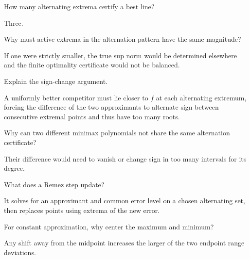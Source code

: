 \begin{problem}\label{prob:ii23-problem-03}
How many alternating extrema certify a best line?
\end{problem}
\begin{solution}
Three.
\end{solution}

\begin{problem}\label{prob:ii23-problem-04}
Why must active extrema in the alternation pattern have the same magnitude?
\end{problem}
\begin{solution}
If one were strictly smaller, the true sup norm would be determined elsewhere and the finite optimality certificate would not be balanced.
\end{solution}

\begin{problem}\label{prob:ii23-problem-05}
Explain the sign-change argument.
\end{problem}
\begin{solution}
A uniformly better competitor must lie closer to $f$ at each alternating extremum, forcing the difference of the two approximants to alternate sign between consecutive extremal points and thus have too many roots.
\end{solution}

\begin{problem}[Uniqueness]\label{prob:ii23-problem-06}
Why can two different minimax polynomials not share the same alternation certificate?
\end{problem}
\begin{solution}
Their difference would need to vanish or change sign in too many intervals for its degree.
\end{solution}

\begin{problem}\label{prob:ii23-problem-07}
What does a Remez step update?
\end{problem}
\begin{solution}
It solves for an approximant and common error level on a chosen alternating set, then replaces points using extrema of the new error.
\end{solution}

\begin{problem}\label{prob:ii23-problem-08}
For constant approximation, why center the maximum and minimum?
\end{problem}
\begin{solution}
Any shift away from the midpoint increases the larger of the two endpoint range deviations.
\end{solution}

